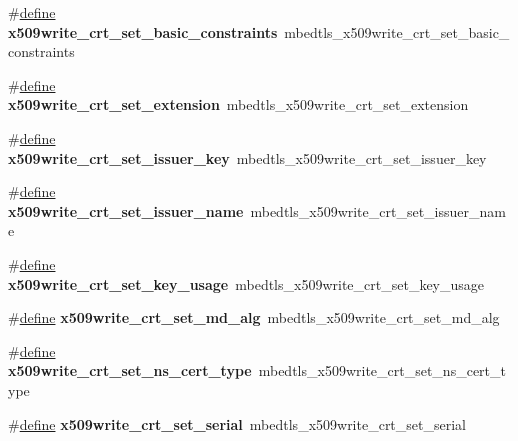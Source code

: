 \begin{DoxyCompactItemize}
\item 
\mbox{\label{compat-1_83_8h_a041063a49ad9d0bf1ad9e89ffb394bc3}} 
\#\hyperlink{structdefine}{define} {\bfseries x509write\+\_\+crt\+\_\+set\+\_\+basic\+\_\+constraints}~mbedtls\+\_\+x509write\+\_\+crt\+\_\+set\+\_\+basic\+\_\+constraints
\item 
\mbox{\label{compat-1_83_8h_a01c6f281af6d0e3719d14289074a6208}} 
\#\hyperlink{structdefine}{define} {\bfseries x509write\+\_\+crt\+\_\+set\+\_\+extension}~mbedtls\+\_\+x509write\+\_\+crt\+\_\+set\+\_\+extension
\item 
\mbox{\label{compat-1_83_8h_a0b0290b81dc06cb28fb5dcb6abcb0281}} 
\#\hyperlink{structdefine}{define} {\bfseries x509write\+\_\+crt\+\_\+set\+\_\+issuer\+\_\+key}~mbedtls\+\_\+x509write\+\_\+crt\+\_\+set\+\_\+issuer\+\_\+key
\item 
\mbox{\label{compat-1_83_8h_af172c1d7b28a03c001b15ffd85d8a18a}} 
\#\hyperlink{structdefine}{define} {\bfseries x509write\+\_\+crt\+\_\+set\+\_\+issuer\+\_\+name}~mbedtls\+\_\+x509write\+\_\+crt\+\_\+set\+\_\+issuer\+\_\+name
\item 
\mbox{\label{compat-1_83_8h_a7ddb9e907d38eb1e91c207399ede8e18}} 
\#\hyperlink{structdefine}{define} {\bfseries x509write\+\_\+crt\+\_\+set\+\_\+key\+\_\+usage}~mbedtls\+\_\+x509write\+\_\+crt\+\_\+set\+\_\+key\+\_\+usage
\item 
\mbox{\label{compat-1_83_8h_a78da3cf3f1ed0944988eae988204df98}} 
\#\hyperlink{structdefine}{define} {\bfseries x509write\+\_\+crt\+\_\+set\+\_\+md\+\_\+alg}~mbedtls\+\_\+x509write\+\_\+crt\+\_\+set\+\_\+md\+\_\+alg
\item 
\mbox{\label{compat-1_83_8h_ab60e85b54c474b70f0bc08001d73d4e4}} 
\#\hyperlink{structdefine}{define} {\bfseries x509write\+\_\+crt\+\_\+set\+\_\+ns\+\_\+cert\+\_\+type}~mbedtls\+\_\+x509write\+\_\+crt\+\_\+set\+\_\+ns\+\_\+cert\+\_\+type
\item 
\mbox{\label{compat-1_83_8h_ac5fd20973d471bcd2965925d44a39e01}} 
\#\hyperlink{structdefine}{define} {\bfseries x509write\+\_\+crt\+\_\+set\+\_\+serial}~mbedtls\+\_\+x509write\+\_\+crt\+\_\+set\+\_\+serial

\end{DoxyCompactItemize}
